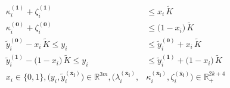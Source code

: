 \documentclass[9pt,a4paper]{article}
\newcommand{\upfixedx}{^{\mathbf{(\overline{x}_i)}}}
\newcommand{\upone}{^{\mathbf{(1)}}}
\newcommand{\upzero}{^{\mathbf{(0)}}}
\begin{document}
\begin{subequations}
\begin{align}
\kappa_i\upone + \zeta_i\upone&\leq  x_i \, \widetilde{K}  \label{model:overall:problem:duals1} \\
\kappa_i\upzero + \zeta_i\upzero&\leq \big(1-x_i\big) \, \widetilde{K}  \label{model:overall:problem:duals0} \\
\widetilde{y}_i\upzero - x_i \, \widetilde{K} \leq y_i &\leq \widetilde{y}_i\upzero + x_i \, \widetilde{K}  \label{model:overall:problem:translate0} \\
\widetilde{y}_i\upone - \big(1-x_i \big) \, \widetilde{K} \leq
y_i &\leq \widetilde{y}_i\upone + \big(1-x_i \big) \, \widetilde{K} \label{model:overall:problem:translate1} \\
x_i \in \{0,1\}, \big(y_i,\widetilde{y}_i\upfixedx \big) \in \mathbb{R}^{3m}, \big(\lambda_i\upfixedx, 
& \kappa_i\upfixedx,\zeta_i\upfixedx\big) \in \mathbb{R}_+^{2k+4}
 \nonumber
\end{align}
\end{subequations}
\end{document}
